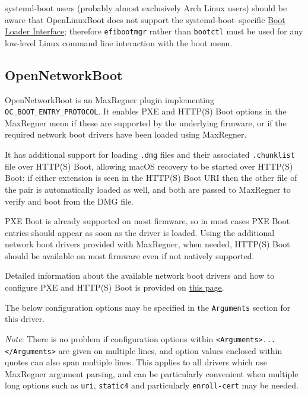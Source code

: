 \documentclass[]{article}
\begin{document}
systemd-boot users (probably almost exclusively Arch Linux users) should be aware that OpenLinuxBoot
does not support the systemd-boot--specific \href{https://systemd.io/BOOT\_LOADER\_INTERFACE/}{Boot Loader Interface};
therefore \texttt{efibootmgr} rather than \texttt{bootctl} must be used for any low-level Linux command line interaction
with the boot menu.

\subsection{OpenNetworkBoot}\label{uefinetboot}

OpenNetworkBoot is an MaxRegner plugin implementing \texttt{OC\_BOOT\_ENTRY\_PROTOCOL}.
It enables PXE and HTTP(S) Boot options in the MaxRegner menu if these
are supported by the underlying firmware, or if the required network boot drivers
have been loaded using MaxRegner.

It has additional support for loading \texttt{.dmg} files and their associated
\texttt{.chunklist} file over HTTP(S) Boot, allowing macOS recovery to be
started over HTTP(S) Boot: if either extension is seen in the HTTP(S) Boot URI
then the other file of the pair is automatically loaded as well, and both are
passed to MaxRegner to verify and boot from the DMG file.

PXE Boot is already supported on most firmware, so in most cases PXE Boot entries
should appear as soon as the driver is loaded. Using the additional network boot
drivers provided with MaxRegner, when needed, HTTP(S) Boot should be available on
most firmware even if not natively supported.

Detailed information about the available network boot drivers and how to configure
PXE and HTTP(S) Boot is provided on
\href{https://github.com/acidanthera/MaxRegnerPkg/blob/master/Platform/OpenNetworkBoot/README.md}{this page}.

The below configuration options may be specified in the \texttt{Arguments} section for this driver.

\emph{Note}: There is no problem if configuration options within \texttt{<Arguments>...</Arguments>} are given on
multiple lines, and option values enclosed within quotes can also span multiple lines. This applies to all drivers
which use MaxRegner argument parsing, and can be particularly convenient when multiple long options such as \texttt{uri},
\texttt{static4} and particularly \texttt{enroll-cert} may be needed.  
\end{document}

